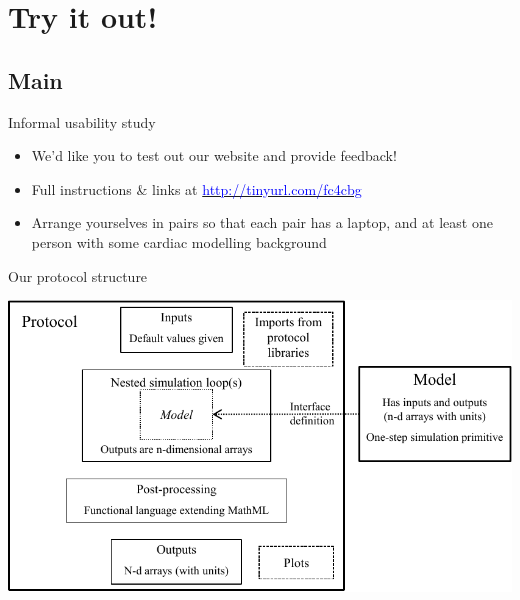 \documentclass[t,xcolor={usenames,dvipsnames}]{beamer}
\newcommand{\myhref}[2]{\href{#1}{\textcolor{Blue}{#2}}}
\newcommand{\myurl}[1]{\myhref{#1}{#1}}
\begin{document}
\section{Try it out!}
\subsection*{Main}

\begin{frame}{Informal usability study}
\begin{itemize}
\item We'd like you to test out our website and provide feedback!
\item Full instructions \& links at \myurl{http://tinyurl.com/fc4cbg}
\item Arrange yourselves in pairs so that each pair has a laptop, and at least one person with some cardiac modelling background
\end{itemize}
\end{frame}


\appendix

\begin{frame}{Our protocol structure}
\begin{center}
\includegraphics[width=\textwidth]{protocol_language}
\end{center}
\end{frame}
\end{document}
